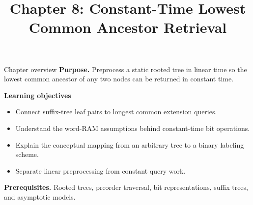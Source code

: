 \documentclass[11pt,letterpaper]{article}
\title{Chapter 8: Constant-Time Lowest Common Ancestor Retrieval}
\author{}
\date{}
\begin{document}
\maketitle

\begin{CornellOverviewBox}{Chapter overview}
\textbf{Purpose.} Preprocess a static rooted tree in linear time so the lowest common ancestor of any two nodes can be returned in constant time.

\textbf{Learning objectives}
\begin{itemize}
  \item Connect suffix-tree leaf pairs to longest common extension queries.
  \item Understand the word-RAM assumptions behind constant-time bit operations.
  \item Explain the conceptual mapping from an arbitrary tree to a binary labeling scheme.
  \item Separate linear preprocessing from constant query work.
\end{itemize}

\textbf{Prerequisites.} Rooted trees, preorder traversal, bit representations, suffix trees, and asymptotic models.
\end{CornellOverviewBox}
\end{document}

